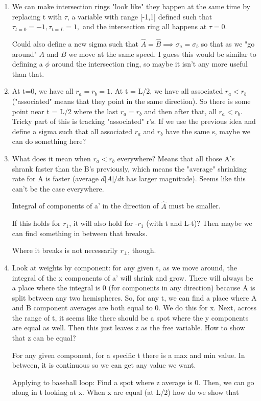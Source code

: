 \documentclass[12pt]{article}
\begin{document}
\begin{enumerate}
\item We can make intersection rings "look like" they happen at the same time by replacing t with $\tau$, a variable with range [-1,1] defined such that $\tau_{t=0}=-1, \tau_{t=L}=1,$ and the intersection ring all happens at $\tau = 0$.

Could also define a new sigma such that $\hat{A} = \hat{B} \implies \sigma_a = \sigma_b$ so that as we "go around" $A$ and $B$ we move at the same speed. I guess this would be similar to defining a $\phi$ around the intersection ring, so maybe it isn't any more useful than that.

\item At t=0, we have all $r_a = r_b = 1$. At t = L/2, we have all associated $r_a < r_b$ ("associated" means that they point in the same direction). So there is some point near t = L/2 where the last $r_a = r_b$ and then after that, all $r_a < r_b$. Tricky part of this is tracking "associated" r's. If we use the previous idea and define a sigma such that all associated $r_a$ and $r_b$ have the same s, maybe we can do something here? 

\item What does it mean when $r_a < r_b$ everywhere? Means that all those A's shrank faster than the B's previously, which means the "average" shrinking rate for A is faster (average $d|A|/dt$ has larger magnitude). Seems like this can't be the case everywhere.

Integral of components of a' in the direction of $\hat{A}$ must be smaller.

If this holds for $r_1$, it will also hold for -$r_1$ (with t and L-t)? Then maybe we can find something in between that breaks.

Where it breaks is not necessarily $r_{\bot}$, though.

\item Look at weights by component: for any given t, as we move around, the integral of the x components of a' will shrink and grow. There will always be a place where the integral is 0 (for components in any direction) because A is split between any two hemispheres. So, for any t, we can find a place where A and B component averages are both equal to 0. We do this for x. Next, across the range of t, it seems like there should be a spot where the y components are equal as well. Then this just leaves z as the free variable. How to show that z can be equal?

For any given component, for a specific t there is a max and min value. In between, it is continuous so we can get any value we want.

Applying to baseball loop: Find a spot where z average is 0. Then, we can go along in t looking at x. When x are equal (at L/2) how do we show that 
\end{enumerate}
\end{document}
